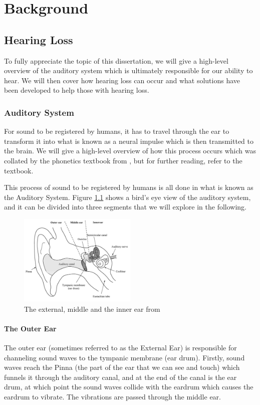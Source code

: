 \documentclass[logo,bsc,singlespacing,parskip,online]{infthesis}
\begin{document}
\chapter{Background}
\label{ch:background}

\section{Hearing Loss}
To fully appreciate the topic of this dissertation,
we will give a high-level overview of the auditory system 
which is ultimately responsible for our ability to hear.
We will then cover how hearing loss can occur and 
what solutions have been developed to help those with hearing loss.
\subsection{Auditory System}
For sound to be registered by humans, it has to travel through the ear to transform it into
what is known as a neural impulse which is then transmitted to the brain. We will 
give a high-level overview of how this process occurs which was collated by the phonetics textbook from \citet{Wayland2018Phonetics},
 but for further reading, refer to the textbook. 

 This process of sound to be registered by humans is all done in what is known as the Auditory System.
 Figure \ref{fig:ear} shows a bird's eye view of the auditory system, and it can be divided into three segments
 that we will explore in the following.

\begin{figure}[h]
   \centering
   \includegraphics[width=0.5\textwidth]{wayland-ear}
   \caption{The external, middle and the inner ear from \citet{Wayland2018Phonetics}}
   \label{fig:ear}
\end{figure}

\subsubsection{The Outer Ear}
The outer ear (sometimes referred to as the External Ear) is responsible for channeling sound waves to the tympanic membrane (ear drum). Firstly,
sound waves reach the Pinna (the part of the ear that we can see and touch) which funnels it through the auditory canal, and at the end of the canal 
is the ear drum, at which point the sound waves collide with the eardrum which causes the eardrum to vibrate. 
The vibrations are passed through the middle ear.
\end{document}
